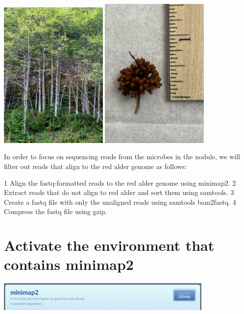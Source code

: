\documentclass[
]{book}
\begin{document}
\includegraphics[width=0.4\textwidth,height=\textheight]{Figures/AlderTree.png}
\includegraphics[width=0.4\textwidth,height=\textheight]{Figures/AlderNodule.png}

In order to focus on sequencing reads from the microbes in the nodule, we will filter out reads that align to the red alder genome as follows:

1 Align the fastq-formatted reads to the red alder genome using minimap2.
2 Extract reads that do not align to red alder and sort them using samtools.
3 Create a fastq file with only the unaligned reads using samtools bam2fastq.
4 Compress the fastq file using gzip.

\hypertarget{activate-the-environment-that-contains-minimap2}{%
\section{Activate the environment that contains minimap2}\label{activate-the-environment-that-contains-minimap2}}

\includegraphics[width=0.8\textwidth,height=\textheight]{Figures/minimap2.png}
\end{document}
